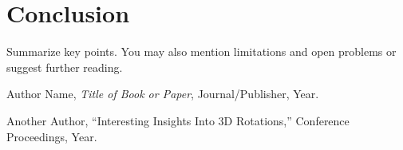\documentclass[11pt]{article}
\begin{document}
\section{Conclusion}
\label{sec:conclusion}

Summarize key points. You may also mention limitations and open problems or suggest further reading.

\begin{thebibliography}{99}

Author Name, \emph{Title of Book or Paper}, Journal/Publisher, Year.

Another Author, ``Interesting Insights Into 3D Rotations,'' Conference Proceedings, Year.


\end{thebibliography}
\end{document}
